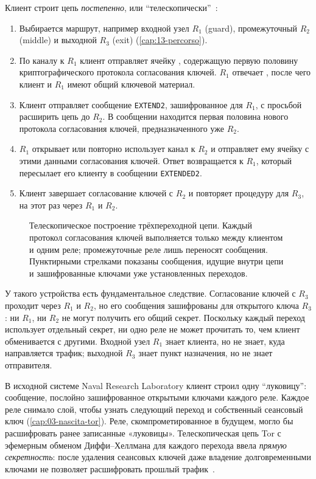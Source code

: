 Клиент строит цепь \emph{постепенно}, или \enquote{телескопически}~\cite{dingledine2004tor}:
\begin{enumerate}
  \item Выбирается маршрут, например входной узел $R_1$ (guard), промежуточный $R_2$ (middle) и выходной $R_3$ (exit) (\cref{cap:13-percorso}).
  \item По каналу к $R_1$ клиент отправляет ячейку , содержащую первую половину криптографического протокола согласования ключей. $R_1$ отвечает , после чего клиент и $R_1$ имеют общий ключевой материал.
  \item Клиент отправляет сообщение \texttt{EXTEND2}, зашифрованное для $R_1$, с просьбой расширить цепь до $R_2$. В сообщении находится первая половина нового протокола согласования ключей, предназначенного уже $R_2$.
  \item $R_1$ открывает или повторно использует канал к $R_2$ и отправляет ему ячейку  с этими данными согласования ключей. Ответ  возвращается к $R_1$, который пересылает его клиенту в сообщении \texttt{EXTENDED2}.
  \item Клиент завершает согласование ключей с $R_2$ и повторяет процедуру для $R_3$, на этот раз через $R_1$ и $R_2$.
\end{enumerate}

\begin{figure}[htbp]
\centering

\caption{Телескопическое построение трёхпереходной цепи. Каждый протокол согласования ключей выполняется только между клиентом и одним реле; промежуточные реле лишь переносят сообщения. Пунктирными стрелками показаны сообщения, идущие внутри цепи и зашифрованные ключами уже установленных переходов.}
\label{fig:telescopio}
\end{figure}

У такого устройства есть фундаментальное следствие. Согласование ключей с $R_3$ проходит через $R_1$ и $R_2$, но его сообщения зашифрованы для открытого ключа $R_3$: ни $R_1$, ни $R_2$ не могут получить его общий секрет. Поскольку каждый переход использует отдельный секрет, ни одно реле не может прочитать то, чем клиент обменивается с другими. Входной узел $R_1$ знает клиента, но не знает, куда направляется трафик; выходной $R_3$ знает пункт назначения, но не знает отправителя.

\begin{storia}
В исходной системе Naval Research Laboratory клиент строил одну \enquote{луковицу}: сообщение, послойно зашифрованное открытыми ключами каждого реле. Каждое реле снимало слой, чтобы узнать следующий переход и собственный сеансовый ключ (\cref{cap:03-nascita-tor}). Реле, скомпрометированное в будущем, могло бы расшифровать ранее записанные «луковицы». Телескопическая цепь Tor с эфемерным обменом Диффи--Хеллмана для каждого перехода ввела \emph{прямую секретность}: после удаления сеансовых ключей даже владение долговременными ключами не позволяет расшифровать прошлый трафик~\cite{dingledine2004tor}.
\end{storia}


